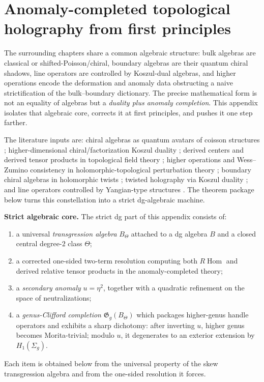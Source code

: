 
\section{Anomaly-completed topological holography from first principles}


The surrounding chapters share a common algebraic structure:
bulk algebras are classical or shifted-Poisson/chiral, boundary algebras are their quantum chiral shadows, line operators are controlled by Koszul-dual algebras, and higher operations encode the deformation and anomaly data obstructing a naive strictification of the bulk--boundary dictionary.
The precise mathematical form is not an equality of algebras but a \emph{duality plus anomaly completion}.
This appendix isolates that algebraic core, corrects it at first principles, and pushes it one step farther.

The literature inputs are:
chiral algebras as quantum avatars of coisson structures \cite{BD04};
higher-dimensional chiral/factorization Koszul duality \cite{FG12};
derived centers and derived tensor products in topological field theory \cite{costello-gaiotto,CP2020,DNP25};
higher operations and Wess--Zumino consistency in holomorphic-topological perturbation theory \cite{GKW25};
boundary chiral algebras in holomorphic twists \cite{CDG20};
twisted holography via Koszul duality \cite{Zeng23};
and line operators controlled by Yangian-type structures \cite{DNP25}.
The theorem package below turns this constellation into a strict dg-algebraic machine.

\medskip

\noindent\textbf{Strict algebraic core.}
The strict dg part of this appendix consists of:
\begin{enumerate}
\item a universal \emph{transgression algebra} \(B_{\Theta}\) attached to a dg algebra \(B\) and a closed central degree-\(2\) class \(\Theta\);
\item a corrected one-sided two-term resolution computing both \(R\!\operatorname{Hom}\) and derived relative tensor products in the anomaly-completed theory;
\item a \emph{secondary anomaly} \(u=\eta^{2}\), together with a quadratic refinement on the space of neutralizations;
\item a \emph{genus-Clifford completion} \(\mathfrak{G}_{g}(B_{\Theta})\) which packages higher-genus handle operators and exhibits a sharp dichotomy:
after inverting \(u\), higher genus becomes Morita-trivial; modulo \(u\), it degenerates to an exterior extension by \(H_{1}(\Sigma_{g})\).
\end{enumerate}
Each item is obtained below from the universal property of the skew
transgression algebra and from the one-sided resolution it forces.

